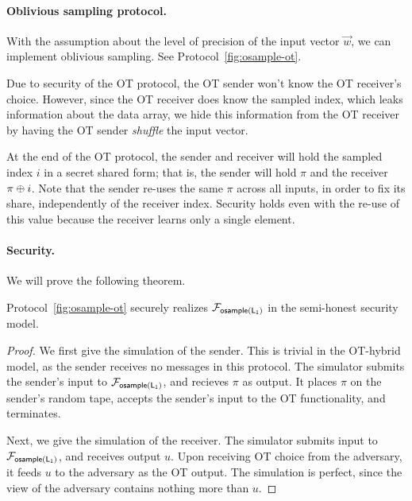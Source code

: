 \paragraph{Oblivious sampling protocol.} 
With the assumption about the level of precision of the input vector
$\vec{w}$, we can implement oblivious sampling. See
Protocol~\ref{fig:osample-ot}. 

Due to security of the OT protocol, the OT sender won't know the OT
receiver's choice. However, since the OT receiver does know the sampled
index, which leaks information about the data array, we hide this
information from the OT receiver by having the OT sender {\em shuffle}
the input vector.     

At the end of the OT protocol, the sender and receiver will hold the
sampled index $i$ in a secret shared form; that is, the sender will hold
$\pi$ and the receiver $\pi \oplus i$.  Note that the sender re-uses the
same $\pi$ across all inputs, in order to fix its share, independently
of the receiver index.  Security holds even with the re-use of this
value because the receiver learns only a single element.


\paragraph{Security.}
We will prove the following theorem. 
\begin{theorem} \label{thm:osample-ot}
Protocol~\ref{fig:osample-ot} securely realizes $\mathcal{F}_{{\mathsf{osample(L_1)}}}$ in the
semi-honest security model. 
\end{theorem} 


\begin{proof}
We first give the simulation of the sender. This is trivial in the OT-hybrid model, as the sender receives no messages in this protocol.  The simulator submits the sender's input to $\mathcal{F}_{{\mathsf{osample(L_1)}}}$, and recieves $\pi$ as output.  It places $\pi$ on the sender's random tape, accepts the sender's input to the OT functionality, and terminates.  

Next, we give the simulation of the receiver.  The simulator submits input to $\mathcal{F}_{{\mathsf{osample(L_1)}}}$, and receives output $u$.  Upon receiving OT
choice from the adversary, it feeds $u$ to the adversary as the OT
output. 
The simulation is perfect, since the view of the adversary contains nothing more than 
$u$. 
\end{proof}

